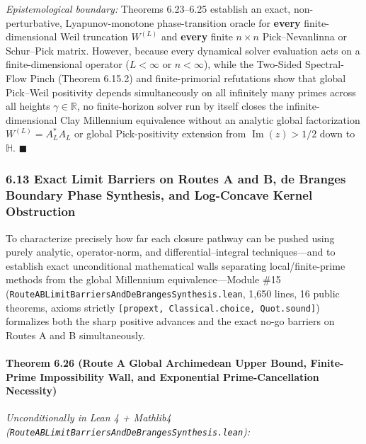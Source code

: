 \documentclass[
  11pt,
]{article}
\begin{document}
\begin{enumerate}
  \emph{Epistemological boundary:} Theorems 6.23--6.25 establish an
  exact, non-perturbative, Lyapunov-monotone phase-transition oracle for
  \textbf{every} finite-dimensional Weil truncation \(W^{(L)}\) and
  \textbf{every} finite \(n \times n\) Pick--Nevanlinna or Schur--Pick
  matrix. However, because every dynamical solver evaluation acts on a
  finite-dimensional operator (\(L < \infty\) or \(n < \infty\)), while
  the Two-Sided Spectral-Flow Pinch (Theorem 6.15.2) and
  finite-primorial refutations show that global Pick--Weil positivity
  depends simultaneously on all infinitely many primes across all
  heights \(\gamma \in \mathbb{R}\), no finite-horizon solver run by
  itself closes the infinite-dimensional Clay Millennium equivalence
  without an analytic global factorization \(W^{(L)} = A_L^* A_L\) or
  global Pick-positivity extension from \(\operatorname{Im}(z) > 1/2\)
  down to \(\mathbb{H}\). \(\blacksquare\)
\end{enumerate}

\subsubsection{6.13 Exact Limit Barriers on Routes A and B, de Branges
Boundary Phase Synthesis, and Log-Concave Kernel
Obstruction}\label{exact-limit-barriers-on-routes-a-and-b-de-branges-boundary-phase-synthesis-and-log-concave-kernel-obstruction}

To characterize precisely how far each closure pathway can be pushed
using purely analytic, operator-norm, and differential--integral
techniques---and to establish exact unconditional mathematical walls
separating local/finite-prime methods from the global Millennium
equivalence---Module \#15
(\texttt{RouteABLimitBarriersAndDeBrangesSynthesis.lean}, 1,650 lines,
16 public theorems, axioms strictly
\texttt{{[}propext,\ Classical.choice,\ Quot.sound{]}}) formalizes both
the sharp positive advances and the exact no-go barriers on Routes A and
B simultaneously.

\paragraph{Theorem 6.26 (Route A Global Archimedean Upper Bound,
Finite-Prime Impossibility Wall, and Exponential Prime-Cancellation
Necessity)}\label{theorem-6.26-route-a-global-archimedean-upper-bound-finite-prime-impossibility-wall-and-exponential-prime-cancellation-necessity}

\emph{Unconditionally in Lean 4 + Mathlib4
(\texttt{RouteABLimitBarriersAndDeBrangesSynthesis.lean}):}
\end{document}
